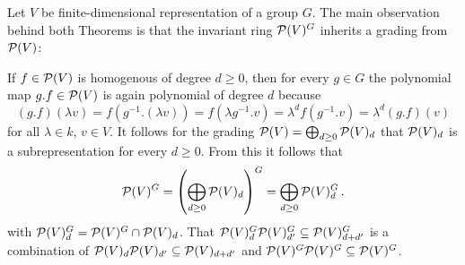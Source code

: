 

\begin{fluff}
  Let $V$ be finite-dimensional representation of a group $G$.
  The main observation behind both Theorems is that the invariant ring $\mathcal{P}(V)^G$ inherits a grading from $\mathcal{P}(V)$:
  
  If $f \in \mathcal{P}(V)$ is homogenous of degree $d \geq 0$, then for every $g \in G$ the polynomial map $g.f \in \mathcal{P}(V)$ is again polynomial of degree $d$ because
  \[
      (g.f)(\lambda v)
    = f(g^{-1}.(\lambda v))
    = f(\lambda g^{-1}.v)
    = \lambda^d f(g^{-1}.v)
    = \lambda^d (g.f)(v)
  \]
  for all $\lambda \in k$, $v \in V$.
  It follows for the grading $\mathcal{P}(V) = \bigoplus_{d \geq 0} \mathcal{P}(V)_d$ that $\mathcal{P}(V)_d$ is a subrepresentation for every $d \geq 0$.
  From this it follows that
  \[
      \mathcal{P}(V)^G
    = \left( \bigoplus_{d \geq 0} \mathcal{P}(V)_d \right)^G
    = \bigoplus_{d \geq 0} \mathcal{P}(V)^G_d \,.
  \]
  with $\mathcal{P}(V)^G_d = \mathcal{P}(V)^G \cap \mathcal{P}(V)_d$.
  That $\mathcal{P}(V)^G_d \mathcal{P}(V)^G_{d'} \subseteq \mathcal{P}(V)^G_{d+d'}$ is a combination of $\mathcal{P}(V)_d \mathcal{P}(V)_{d'} \subseteq \mathcal{P}(V)_{d+d'}$ and $\mathcal{P}(V)^G \mathcal{P}(V)^G \subseteq \mathcal{P}(V)^G$.
\end{fluff}





